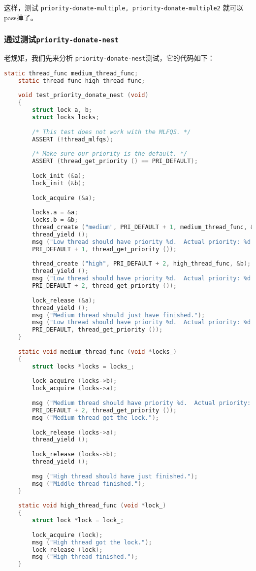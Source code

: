 \documentclass{article}
\begin{document}
	这样，测试 \texttt{priority-donate-multiple, priority-donate-multiple2} 就可以pass掉了。
	
	\subsubsection{通过测试\texttt{priority-donate-nest}}
	
	老规矩，我们先来分析 \texttt{priority-donate-nest}测试，它的代码如下：
	
	\begin{lstlisting}[language=C, title=\texttt{priority-donate-nest}测试]
    static thread_func medium_thread_func;
    static thread_func high_thread_func;
    
    void test_priority_donate_nest (void) 
    {
    	struct lock a, b;
    	struct locks locks;
    	
    	/* This test does not work with the MLFQS. */
    	ASSERT (!thread_mlfqs);
    	
    	/* Make sure our priority is the default. */
    	ASSERT (thread_get_priority () == PRI_DEFAULT);
    	
    	lock_init (&a);
    	lock_init (&b);
    	
    	lock_acquire (&a);
    	
    	locks.a = &a;
    	locks.b = &b;
    	thread_create ("medium", PRI_DEFAULT + 1, medium_thread_func, &locks);
    	thread_yield ();
    	msg ("Low thread should have priority %d.  Actual priority: %d.",
    	PRI_DEFAULT + 1, thread_get_priority ());
    	
    	thread_create ("high", PRI_DEFAULT + 2, high_thread_func, &b);
    	thread_yield ();
    	msg ("Low thread should have priority %d.  Actual priority: %d.",
    	PRI_DEFAULT + 2, thread_get_priority ());
    	
    	lock_release (&a);
    	thread_yield ();
    	msg ("Medium thread should just have finished.");
    	msg ("Low thread should have priority %d.  Actual priority: %d.",
    	PRI_DEFAULT, thread_get_priority ());
    }
    
    static void medium_thread_func (void *locks_) 
    {
    	struct locks *locks = locks_;
    	
    	lock_acquire (locks->b);
    	lock_acquire (locks->a);
    	
    	msg ("Medium thread should have priority %d.  Actual priority: %d.",
    	PRI_DEFAULT + 2, thread_get_priority ());
    	msg ("Medium thread got the lock.");
    	
    	lock_release (locks->a);
    	thread_yield ();
    	
    	lock_release (locks->b);
    	thread_yield ();
    	
    	msg ("High thread should have just finished.");
    	msg ("Middle thread finished.");
    }
    
    static void high_thread_func (void *lock_) 
    {
    	struct lock *lock = lock_;
    	
    	lock_acquire (lock);
    	msg ("High thread got the lock.");
    	lock_release (lock);
    	msg ("High thread finished.");
    }
	\end{lstlisting}
	
\end{document}

